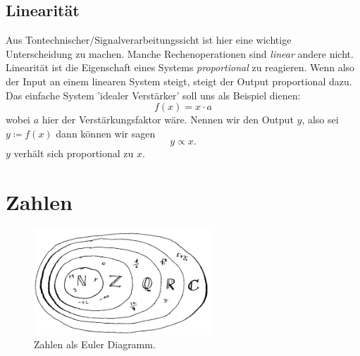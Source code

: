 \subsection{Linearität}
Aus Tontechnischer/Signalverarbeitungssicht ist hier eine wichtige Unterscheidung zu machen. Manche Rechenoperationen sind \emph{linear} andere nicht. 
Linearität ist die Eigenschaft eines Systems \emph{proportional} zu reagieren.
Wenn also der Input an einem linearen System steigt, steigt der Output proportional dazu. Das einfache System 'idealer Verstärker' soll uns als Beispiel dienen:
$$f(x) = x \cdot a$$ wobei $a$ hier der Verstärkungsfaktor wäre. Nennen wir den Output $y$, also sei $y \coloneqq f(x)$ dann können wir sagen $$y \propto x.$$ 
$y$ verhält sich proportional zu $x$. 


\section{Zahlen}

\begin{figure}[h!]
    \centering
    \includegraphics[width=0.6\textwidth]{img/zahlen.png}
    \caption{Zahlen als Euler Diagramm. }
    \label{fig:zahlen}
\end{figure}



